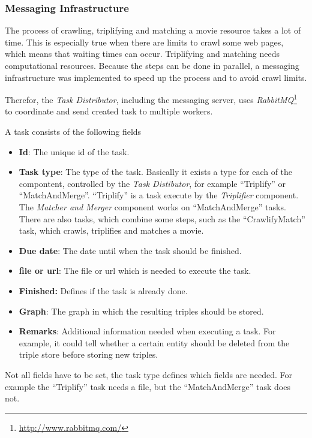 \subsubsection{Messaging Infrastructure}
\label{subsubsec_messaging_infrastructure}


The process of crawling, triplifying and matching a movie resource takes a lot of time.
This is especially true when there are limits to crawl some web pages, which means that waiting times can occur.
Triplifying and matching needs computational resources.
Because the steps can be done in parallel, a messaging infrastructure was implemented to speed up the process and to avoid crawl limits.

Therefor, the \textit{Task Distributor}, including the messaging server, uses \emph{RabbitMQ}\footnote{\url{http://www.rabbitmq.com/}} to coordinate and send created task to multiple workers.

A task consists of the following fields
\begin{itemize}
  \item \textbf{Id}:
  The unique id of the task.
  \item \textbf{Task type}:
   The type of the task.
  Basically it exists a type for each of the compontent, controlled by the \textit{Task Distibutor}, for example ``Triplify'' or ``MatchAndMerge''.
  ``Triplify'' is a task execute by the \textit{Triplifier} component.
  The \textit{Matcher and Merger} component works on ``MatchAndMerge'' tasks.
  There are also tasks, which combine some steps, such as the ``CrawlifyMatch'' task, which crawls, triplifies and matches a movie.
  \item \textbf{Due date}:
  The date until when the task should be finished.
  \item \textbf{file or url}:
  The file or url which is needed to execute the task.
  \item \textbf{Finished:}
  Defines if the task is already done.
  \item \textbf{Graph}:
  The graph in which the resulting triples should be stored.
  \item \textbf{Remarks}:
  Additional information needed when executing a task.
  For example, it could tell whether a certain entity should be deleted from the triple store before storing new triples.
\end{itemize}
Not all fields have to be set, the task type defines which fields are needed.
For example the ``Triplify'' task needs a file, but the ``MatchAndMerge'' task does not.

